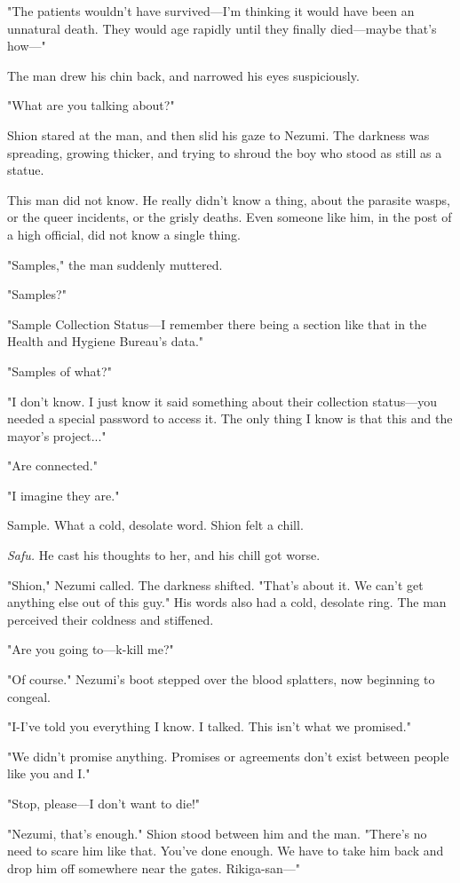 "The patients wouldn't have survived---I'm thinking it would have been an
unnatural death. They would age rapidly until they finally died---maybe
that's how---"

The man drew his chin back, and narrowed his eyes suspiciously.

"What are you talking about?"

Shion stared at the man, and then slid his gaze to Nezumi. The darkness
was spreading, growing thicker, and trying to shroud the boy who stood
as still as a statue.

This man did not know. He really didn't know a thing, about the parasite
wasps, or the queer incidents, or the grisly deaths. Even someone like
him, in the post of a high official, did not know a single thing.

"Samples," the man suddenly muttered.

"Samples?"

"Sample Collection Status---I remember there being a section like that in
the Health and Hygiene Bureau's data."

\mybreak

"Samples of what?"

"I don't know. I just know it said something about their collection
status---you needed a special password to access it. The only thing I know
is that this and the mayor's project..."

"Are connected."

"I imagine they are."

Sample. What a cold, desolate word. Shion felt a chill.

\emph{Safu.} He cast his thoughts to her, and his chill got worse.

"Shion," Nezumi called. The darkness shifted. "That's about it. We can't
get anything else out of this guy." His words also had a cold, desolate
ring. The man perceived their coldness and stiffened.

"Are you going to---k-kill me?"~

"Of course." Nezumi's boot stepped over the blood splatters, now
beginning to congeal.

"I-I've told you everything I know. I talked. This isn't what we
promised."

"We didn't promise anything. Promises or agreements don't exist between
people like you and I."

"Stop, please---I don't want to die!"

"Nezumi, that's enough." Shion stood between him and the man. "There's
no need to scare him like that. You've done enough. We have to take him
back and drop him off somewhere near the gates. Rikiga-san---"

